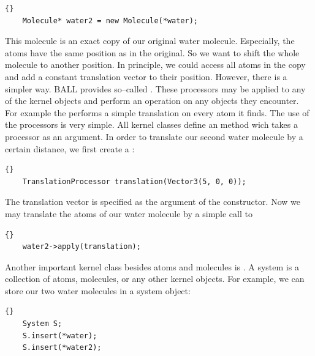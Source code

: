 \begin{lstlisting}{}
	Molecule* water2 = new Molecule(*water);
\end{lstlisting}
	
\noindent
This molecule is an exact copy of our original water molecule. Especially, the
atoms have the same position as in the original. So we want to shift the whole
molecule to another position.  In principle, we could access all atoms in the
copy and add a constant translation vector to their position. However, there
is a simpler way. BALL provides so--called . These
processors may be applied to any of the kernel objects and perform an
operation on any objects they encounter. For example the
 performs a simple translation on every atom it
finds. The use of the processors is very simple.  All kernel classes define an
 method wich takes a processor as an argument. In order to
translate our second water molecule by a certain distance, we first create a
:

\begin{lstlisting}{}
	TranslationProcessor translation(Vector3(5, 0, 0));
\end{lstlisting}
	
\noindent
The translation vector is specified as the argument of the constructor. Now we
may translate the atoms of our water molecule by a simple call to 

\begin{lstlisting}{}
	water2->apply(translation);
\end{lstlisting}

\noindent
Another important kernel class besides atoms and molecules is .
A system is a collection of atoms, molecules, or any other kernel objects. For
example, we can store our two water molecules in a system object:

\begin{lstlisting}{}
	System S;
	S.insert(*water);
	S.insert(*water2);
\end{lstlisting}

